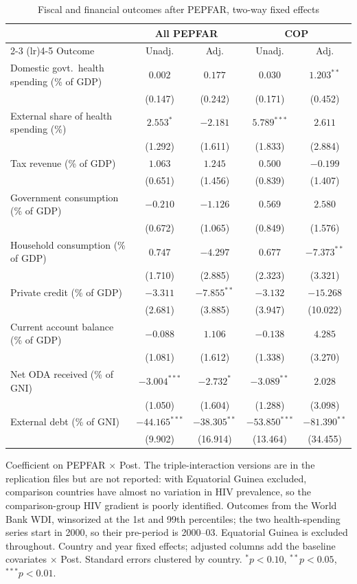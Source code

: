 \begin{table}[htbp]
\centering
\small
\caption{Fiscal and financial outcomes after PEPFAR, two-way fixed effects}
\label{tab:crown_fiscal}
\begin{tabular}{lcccc}
\toprule
 & \multicolumn{2}{c}{All PEPFAR} & \multicolumn{2}{c}{COP} \\
\cmidrule(lr){2-3} \cmidrule(lr){4-5}
Outcome & Unadj. & Adj. & Unadj. & Adj. \\
\midrule
Domestic govt.\ health spending (\% of GDP) & $0.002$ & $0.177$ & $0.030$ & $1.203^{**}$ \\
 & (0.147) & (0.242) & (0.171) & (0.452) \\
External share of health spending (\%) & $2.553^{*}$ & $-2.181$ & $5.789^{***}$ & $2.611$ \\
 & (1.292) & (1.611) & (1.833) & (2.884) \\
Tax revenue (\% of GDP) & $1.063$ & $1.245$ & $0.500$ & $-0.199$ \\
 & (0.651) & (1.456) & (0.839) & (1.407) \\
Government consumption (\% of GDP) & $-0.210$ & $-1.126$ & $0.569$ & $2.580$ \\
 & (0.672) & (1.065) & (0.849) & (1.576) \\
Household consumption (\% of GDP) & $0.747$ & $-4.297$ & $0.677$ & $-7.373^{**}$ \\
 & (1.710) & (2.885) & (2.323) & (3.321) \\
Private credit (\% of GDP) & $-3.311$ & $-7.855^{**}$ & $-3.132$ & $-15.268$ \\
 & (2.681) & (3.885) & (3.947) & (10.022) \\
Current account balance (\% of GDP) & $-0.088$ & $1.106$ & $-0.138$ & $4.285$ \\
 & (1.081) & (1.612) & (1.338) & (3.270) \\
Net ODA received (\% of GNI) & $-3.004^{***}$ & $-2.732^{*}$ & $-3.089^{**}$ & $2.028$ \\
 & (1.050) & (1.604) & (1.288) & (3.098) \\
External debt (\% of GNI) & $-44.165^{***}$ & $-38.305^{**}$ & $-53.850^{***}$ & $-81.390^{**}$ \\
 & (9.902) & (16.914) & (13.464) & (34.455) \\
\bottomrule
\end{tabular}
\par\vspace{4pt}
\begin{minipage}{\textwidth}\footnotesize Coefficient on PEPFAR $\times$ Post. The triple-interaction versions are in the replication files but are not reported: with Equatorial Guinea excluded, comparison countries have almost no variation in HIV prevalence, so the comparison-group HIV gradient is poorly identified. Outcomes from the World Bank WDI, winsorized at the 1st and 99th percentiles; the two health-spending series start in 2000, so their pre-period is 2000--03. Equatorial Guinea is excluded throughout. Country and year fixed effects; adjusted columns add the baseline covariates $\times$ Post. Standard errors clustered by country. $^{*}p<0.10$, $^{**}p<0.05$, $^{***}p<0.01$.\end{minipage}
\end{table}
